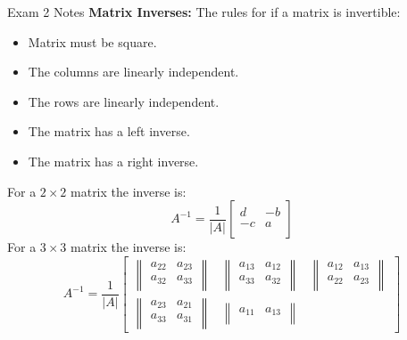 \begin{cheatsheet}{Exam 2 Notes}
    \textbf{Matrix Inverses:} The rules for if a matrix is invertible:
    \begin{itemize}
        \item Matrix must be square.
        \item The columns are linearly independent.
        \item The rows are linearly independent.
        \item The matrix has a left inverse.
        \item The matrix has a right inverse.
    \end{itemize}
    For a $2 \times 2$ matrix the inverse is:
    \begin{equation*}
        A^{-1} =
        \frac{1}{|A|}
        \begin{bmatrix}
            d & -b \\
            -c & a \\
        \end{bmatrix}
    \end{equation*}
    For a $3 \times 3$ matrix the inverse is:
    \begin{equation*}
        A^{-1} = 
        \frac{1}{|A|}
        \begin{bmatrix}
            \begin{Vmatrix}
                a_{22} & a_{23} \\
                a_{32} & a_{33} \\
            \end{Vmatrix} &
            \begin{Vmatrix}
                a_{13} & a_{12} \\
                a_{33} & a_{32} \\
            \end{Vmatrix} &
            \begin{Vmatrix}
                a_{12} & a_{13} \\
                a_{22} & a_{23} \\
            \end{Vmatrix} \\
            \begin{Vmatrix}
                a_{23} & a_{21} \\
                a_{33} & a_{31} \\
            \end{Vmatrix} &
            \begin{Vmatrix}
                a_{11} & a_{13} \\

\end{Vmatrix}
\end{bmatrix}
\end{equation*}
\end{cheatsheet}
